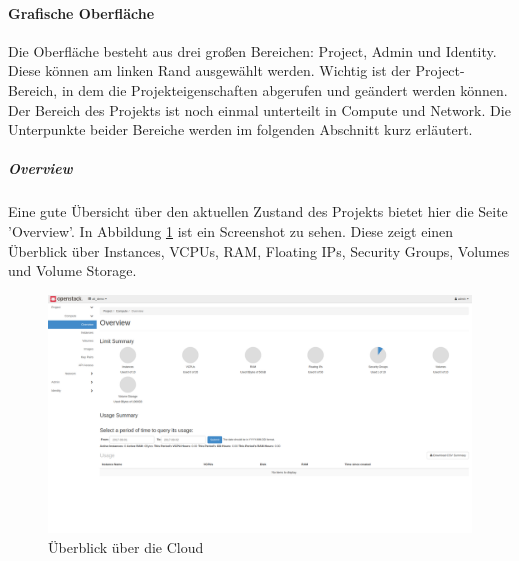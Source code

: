 \documentclass[a4paper,10pt]{article}
\begin{document}
\paragraph{Grafische Oberfläche}

Die Oberfläche besteht aus drei großen Bereichen: Project, Admin und Identity.
Diese können am linken Rand ausgewählt werden.
Wichtig ist der Project-Bereich, in dem die Projekteigenschaften abgerufen und geändert werden können.
Der Bereich des Projekts ist noch einmal unterteilt in Compute und Network.
Die Unterpunkte beider Bereiche werden im folgenden Abschnitt kurz erläutert.

\subparagraph{Overview}

Eine gute Übersicht über den aktuellen Zustand des Projekts bietet hier die Seite 'Overview'.
In Abbildung \ref{fig:devstack:overview} ist ein Screenshot zu sehen.
Diese zeigt einen Überblick über Instances, VCPUs, RAM, Floating IPs, Security Groups, Volumes und Volume Storage.

\begin{figure}[htbp]
\centering
\caption{Überblick über die Cloud}
\label{fig:devstack:overview}
\includegraphics[width=\textwidth, trim={0 5cm 0 0}, clip]{graphics/devstack/01_Overview}
\end{figure}
\end{document}
